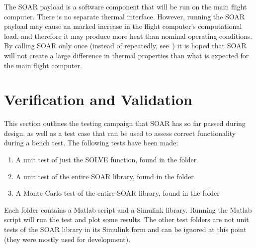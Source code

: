 \documentclass[10pt]{article}
\begin{document}
The SOAR payload is a software component that will be run on the main flight computer. There is no separate thermal interface. However, running the SOAR payload may cause an marked increase in the flight computer's computational load, and therefore it may produce more heat than nominal operating conditions. By calling SOAR only once (instead of repeatedly, see~) it is hoped that SOAR will not create a large difference in thermal properties than what is expected for the main flight computer.

\section{Verification and Validation}\label{sec:v_and_v}

This section outlines the testing campaign that SOAR has so far passed during design, as well as a test case that can be used to assess correct functionality during a bench test. The following tests have been made:
\begin{enumerate}
\item A unit test of just the SOLVE function, found in the folder 
\begin{center}
\end{center}
\item A unit test of the entire SOAR library, found in the folder
\begin{center}
\end{center}
\item A Monte Carlo test of the entire SOAR library, found in the folder
\begin{center}
\end{center}
\end{enumerate}
Each folder contains a Matlab script and a Simulink library. Running the Matlab script will run the test and plot some results. The other test folders are not unit tests of the SOAR library in its Simulink form and can be ignored at this point (they were mostly used for development). 
\end{document}
